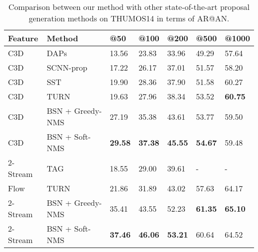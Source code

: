 \documentclass[runningheads]{llncs}
\begin{document}
\begin{table}[tbp]
\setlength{\abovecaptionskip}{-0.05cm} %
\setlength{\belowcaptionskip}{0.1cm} %
\centering
\caption{ Comparison between our method with other state-of-the-art  proposal generation methods on  THUMOS14 in terms of AR@AN.} %
\begin{tabular}{m{1.9cm}<{\centering}m{3.1cm}m{1.2cm}<{\centering}m{1.2cm}<{\centering}m{1.2cm}<{\centering}m{1.2cm}<{\centering}m{1.2cm}<{\centering}}
\toprule
Feature & Method  		& @50 & @100  & @200 & @500 & @1000    \\
\hline
C3D & DAPs \cite{escorcia2016daps} 		& 13.56	& 23.83 &  33.96 & 49.29 & 57.64   \\
C3D & SCNN-prop \cite{shou2016action} 	& 17.22 & 26.17 &  37.01 & 51.57 & 58.20   \\
C3D & SST \cite{sst_buch_cvpr17}			& 19.90 & 28.36  &  37.90 & 51.58 & 60.27   \\
C3D & TURN \cite{gao2017turn} 			& 19.63 & 27.96 &  38.34 & 53.52 & {\bf 60.75}  \\
\hline
C3D & BSN + Greedy-NMS 	& 27.19 & 35.38 &  43.61 &  53.77  & 59.50   \\
C3D & BSN + Soft-NMS	& {\bf 29.58} & {\bf 37.38} &  {\bf 45.55} & {\bf 54.67} & 59.48   \\
\hline
\hline
2-Stream & TAG \cite{zhao2017temporal} 		& 18.55 & 29.00  &  39.61 & - & -  \\
Flow & TURN \cite{gao2017turn} 		& 21.86 & 31.89 & 43.02 & 57.63  & 64.17  \\
\hline
2-Stream & BSN + Greedy-NMS & 	 35.41 & 43.55 &  52.23 & {\bf 61.35} & {\bf 65.10 } \\
2-Stream & BSN + Soft-NMS & {\bf 37.46} & {\bf 46.06} &  {\bf 53.21} & 60.64 &  64.52   \\
\bottomrule
\end{tabular}
\label{table_comparison_2}
\vspace{-0.4cm}
\end{table}



\end{document}

